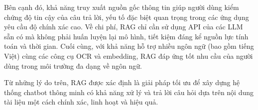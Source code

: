 Bên cạnh đó, khả năng truy xuất nguồn gốc thông tin giúp người dùng kiểm chứng độ tin cậy của câu trả lời, yếu tố đặc biệt quan trọng trong các ứng dụng yêu cầu độ chính xác cao. Về chi phí, RAG chỉ cần sử dụng API của các LLM sẵn có mà không phải huấn luyện lại mô hình, tiết kiệm đáng kể nguồn lực tính toán và thời gian. Cuối cùng, với khả năng hỗ trợ nhiều ngôn ngữ (bao gồm tiếng Việt) cùng các công cụ OCR và embedding, RAG đáp ứng tốt nhu cầu của người dùng trong môi trường đa dạng về ngôn ngữ.

Từ những lý do trên, RAG được xác định là giải pháp tối ưu để xây dựng hệ thống chatbot thông minh có khả năng xử lý và trả lời câu hỏi dựa trên nội dung tài liệu một cách chính xác, linh hoạt và hiệu quả.
